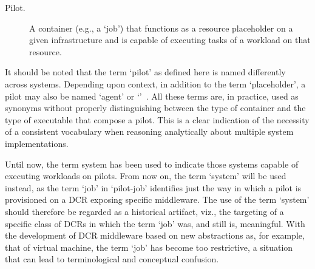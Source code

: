 \documentclass{sig-alternate}
\begin{document}

\begin{description}

\item[Pilot.] A container (e.g., a `job') that functions as a resource
placeholder on a given infrastructure and is capable of executing tasks of a
workload on that resource.

\end{description}

It should be noted that the term `pilot' as defined here is named differently
across \pilotjob systems. Depending upon context, in addition to the term
`placeholder', a pilot may also be named `agent' or
`\pilotjob'~\cite{moscicki2011,pinchak2002}. All these terms are, in practice,
used as synonyms without properly distinguishing between the type of container
and the type of executable that compose a pilot. This is a clear indication of
the necessity of a consistent vocabulary when
reasoning analytically about multiple \pilotjob system implementations.


Until now, the term \pilotjob system has been used to indicate those systems
capable of executing workloads on pilots. From now on, the term `\pilot system'
will be used instead, as the term `job' in `pilot-job' identifies just the way
in which a pilot is provisioned on a DCR exposing specific middleware.
The use of the term `\pilotjob system' should therefore be regarded as a
historical artifact, viz., the targeting of a specific class of DCRs in which
the term `job' was, and still is, meaningful. With the development of DCR
middleware based on new abstractions as, for example, that of virtual machine,
the term `job' has become too restrictive, a situation that can lead to
terminological and conceptual confusion.
\end{document}
